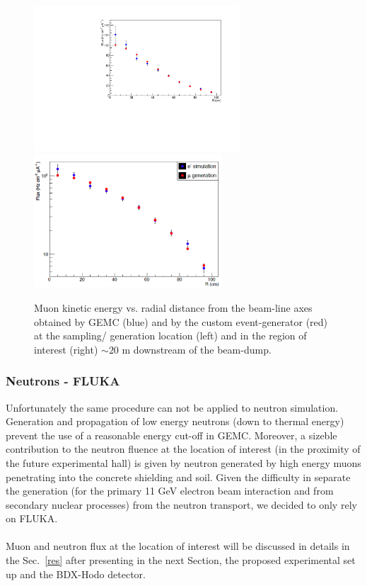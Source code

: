 \begin{figure}[h!] 
\center
\includegraphics[width=7.7cm]{figs/SimVSGen.pdf}
\includegraphics[width=7.0cm]{figs/mu-comp-far.pdf}
\caption{Muon kinetic energy vs. radial  distance from the beam-line axes obtained by GEMC (blue) and by the custom event-generator (red) at the sampling/ generation location (left) and in the region of interest (right) $\sim 20$ m downstream of the beam-dump.}
\label{fig:mu-sampling-extract} 
\end{figure}



\subsubsection{Neutrons - FLUKA}
Unfortunately the same procedure can not be applied to neutron simulation. Generation and propagation of low energy neutrons (down to thermal energy) prevent the use of a reasonable energy cut-off in GEMC. Moreover, a sizeble contribution to the neutron fluence at the location of interest (in the proximity of the future experimental hall) is given by neutron generated by high energy muons penetrating into the concrete shielding and soil. Given the difficulty in separate the generation (for the primary 11 GeV electron beam interaction and from secondary nuclear processes) from the neutron transport,  we decided to only rely on FLUKA.
\\ \\ 
Muon and neutron flux  at  the location of interest will be discussed in details in the Sec.~\ref{res} after presenting in the next Section,  the proposed experimental set up and the BDX-Hodo detector. 



